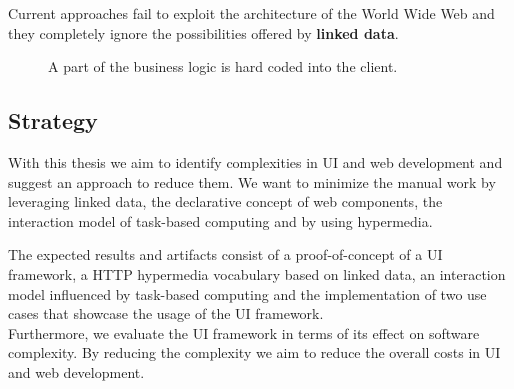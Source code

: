 Current approaches fail to exploit the architecture of the World Wide Web and they completely ignore the possibilities offered by \textbf{linked data}.

\begin{figure}[!htb]
  \caption{\label{fig:my-label} A part of the business logic is hard coded into the client.}
\end{figure}

\subsection{Strategy}\label{strategy}
With this thesis we aim to identify complexities in UI and web development and suggest an approach to reduce them.
We want to minimize the manual work by leveraging linked data, the declarative concept of web components, the interaction model of task-based computing and by using hypermedia.

The expected results and artifacts consist of a proof-of-concept of a UI framework, a HTTP hypermedia vocabulary based on linked data, an interaction model influenced by task-based computing and the implementation of two use cases that showcase the usage of the UI framework. \\
Furthermore, we evaluate the UI framework in terms of its effect on software complexity. By reducing the complexity we aim to reduce the overall costs in UI and web development.
